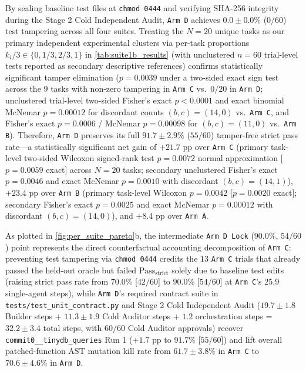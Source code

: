 \documentclass[11pt,a4paper,copyright]{google}
\begin{document}
By sealing baseline test files at \texttt{chmod 0444} and verifying SHA-256 integrity during the Stage 2 Cold Independent Audit, \texttt{Arm D} achieves $0.0 \pm 0.0\%$ ($0/60$) test tampering across all four suites. Treating the $N = 20$ unique tasks as our primary independent experimental clusters via per-task proportions $k_i/3 \in \{0, 1/3, 2/3, 1\}$ in \cref{tab:suite1b_results} (with unclustered $n = 60$ trial-level tests reported as secondary descriptive references) confirms statistically significant tamper elimination ($p = 0.0039$ under a two-sided exact sign test across the $9$ tasks with non-zero tampering in \texttt{Arm C} vs.\ $0/20$ in \texttt{Arm D}; unclustered trial-level two-sided Fisher's exact $p < 0.0001$ and exact binomial McNemar $p = 0.00012$ for discordant counts $(b,c) = (14,0)$ vs.\ \texttt{Arm C}, and Fisher's exact $p = 0.0006$ / McNemar $p = 0.00098$ for $(b,c) = (11,0)$ vs.\ \texttt{Arm B}). Therefore, \texttt{Arm D} preserves its full $91.7 \pm 2.9\%$ ($55/60$) tamper-free strict pass rate---a statistically significant net gain of $+21.7\text{ pp}$ over \texttt{Arm C} (primary task-level two-sided Wilcoxon signed-rank test $p = 0.0072$ normal approximation [$p = 0.0059$ exact] across $N = 20$ tasks; secondary unclustered Fisher's exact $p = 0.0046$ and exact McNemar $p = 0.0010$ with discordant $(b,c) = (14,1)$), $+23.4\text{ pp}$ over \texttt{Arm B} (primary task-level Wilcoxon $p = 0.0042$ [$p = 0.0020$ exact]; secondary Fisher's exact $p = 0.0025$ and exact McNemar $p = 0.00012$ with discordant $(b,c) = (14,0)$), and $+8.4\text{ pp}$ over \texttt{Arm A}.

As plotted in \cref{fig:per_suite_pareto}b, the intermediate \texttt{Arm D Lock} ($90.0\%$, $54/60$) point represents the direct counterfactual accounting decomposition of \texttt{Arm C}: preventing test tampering via \texttt{chmod 0444} credits the $13$ \texttt{Arm C} trials that already passed the held-out oracle but failed $\text{Pass}_{\text{strict}}$ solely due to baseline test edits (raising strict pass rate from $70.0\%$ [$42/60$] to $90.0\%$ [$54/60$] at \texttt{Arm C}'s $25.9$ single-agent steps), while \texttt{Arm D}'s required contract suite in \texttt{tests/\allowbreak test\_unit\_contract.py} and Stage 2 Cold Independent Audit ($19.7 \pm 1.8$ Builder steps + $11.3 \pm 1.9$ Cold Auditor steps + $1.2$ orchestration steps = $32.2 \pm 3.4$ total steps, with $60/60$ Cold Auditor approvals) recover \texttt{commit0\_\_\allowbreak tinydb\_\allowbreak queries} Run 1 ($+1.7\text{ pp}$ to $91.7\%$ [$55/60$]) and lift overall patched-function AST mutation kill rate from $61.7 \pm 3.8\%$ in \texttt{Arm C} to $70.6 \pm 4.6\%$ in \texttt{Arm D}.
\end{document}
